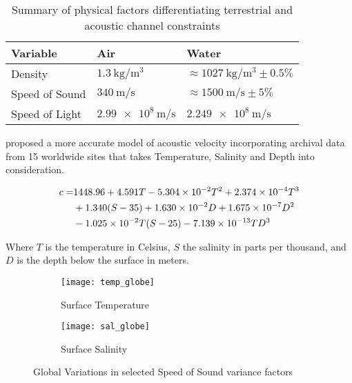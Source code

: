 \begin{table}
	\centering
	\caption{Summary of physical factors differentiating terrestrial and acoustic channel constraints}
	\label{tab:channel_constraings_comp}
	\begin{tabularx}{0.8\textwidth}{X X X}\toprule
		Variable & Air & Water\\
		\midrule
		Density & $\SI{1.3}{\kilogram\per\meter\cubed}$ & $\approx\SI{1027}{\kilogram\per\meter\cubed}\pm0.5\%$ \\
		Speed of Sound & $\SI{340}{\meter\per\second}$ & $\approx\SI{1500}{\meter\per\second}\pm 5\%$ \\
		Speed of Light & $\SI{2.99e8}{\meter\per\second}$ & $\SI{2.249e8}{\meter\per\second}$\\
		\bottomrule
	\end{tabularx}
\end{table}
\citet{Mackenzie1981} proposed a more accurate model of acoustic velocity incorporating archival data from 15 worldwide sites that takes Temperature, Salinity and Depth into consideration.

\begin{align}
  c = & 1448.96 + 4.591 T - 5.304 \times 10^{-2} T^2 + 2.374 \times 10^{-4}T^{3}\notag\\
  & +1.340 (S-35) + 1.630\times 10^{-2}D+1.675\times 10^{-7}D^2\\
  & -1.025 \times 10^{-2}T(S-25) - 7.139\times 10^{-13}TD^3\notag
  \label{equ:mackenzie}
\end{align}

Where $T$ is the temperature in Celsius, $S$ the salinity in parts per thousand, and $D$ is the depth below the surface in meters.

\begin{figure}
	\centering
	\begin{subfigure}[t]{0.8\textwidth}
		\centering
		\texttt{[image: temp\_globe]}
		\caption{Surface Temperature}
		\label{fig:temp_globe}
	\end{subfigure}
	\begin{subfigure}[t]{0.8\textwidth}
		\centering
		\texttt{[image: sal\_globe]}
		\caption{Surface Salinity}
		\label{fig:sal_globe}
	\end{subfigure}
	\caption{Global Variations in selected Speed of Sound variance factors}
	\label{fig:globes}
\end{figure}

